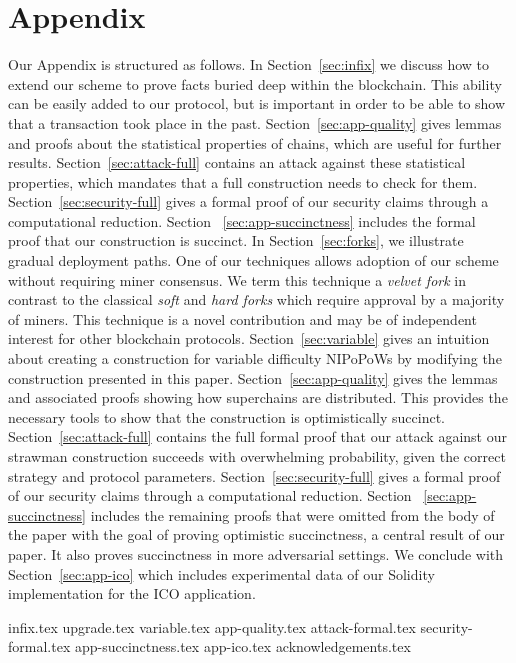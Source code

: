\appendix
\section*{Appendix}

Our Appendix is structured as follows.
In Section~\ref{sec:infix} we discuss how to extend our scheme to prove facts
buried deep within the blockchain. This ability can be easily added to our
protocol, but is important in order to be able to show that a transaction took
place in the past.
Section~\ref{sec:app-quality} gives lemmas and proofs about the statistical
properties of chains, which are useful for further results.
Section~\ref{sec:attack-full} contains
an attack against these statistical properties, which mandates that a full construction needs to check for them. Section~\ref{sec:security-full} gives a formal
proof of our security claims through a computational reduction.
Section~
\ref{sec:app-succinctness} includes the formal proof that our construction is succinct.
In Section~\ref{sec:forks}, we illustrate
gradual deployment paths. One of our techniques allows adoption of our scheme
without requiring miner consensus. We term this technique a \emph{velvet fork}
in contrast to the classical \emph{soft} and \emph{hard forks} which require
approval by a majority of miners. This technique is a novel contribution and may
be of independent interest for other blockchain protocols.
Section~\ref{sec:variable} gives an intuition about creating a construction for
variable difficulty NIPoPoWs by modifying the construction presented in this
paper.
Section~\ref{sec:app-quality} gives the lemmas and associated proofs showing how
superchains are distributed. This provides the necessary tools to show that the
construction is optimistically succinct.
Section~\ref{sec:attack-full} contains
the full formal proof that our attack against our strawman construction succeeds with overwhelming probability, given the correct
strategy and protocol parameters. Section~\ref{sec:security-full} gives a formal
proof of our security claims through a computational reduction. Section~
\ref{sec:app-succinctness} includes the remaining proofs that were omitted from
the body of the paper with the goal of proving optimistic succinctness, a
central result of our paper. It also proves succinctness in more adversarial
settings. We conclude with
Section~\ref{sec:app-ico} which includes experimental data of our Solidity
implementation for the ICO application.

{infix.tex}
{upgrade.tex}
{variable.tex}
{app-quality.tex}
{attack-formal.tex}
{security-formal.tex}
{app-succinctness.tex}
{app-ico.tex}
{acknowledgements.tex}
